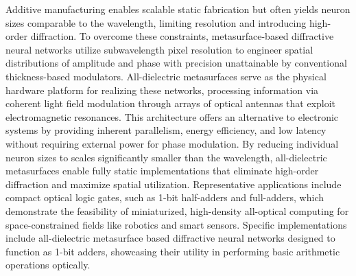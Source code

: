 \documentclass[11pt]{article}
\begin{document}
Additive manufacturing enables scalable static fabrication but often yields neuron sizes comparable to the wavelength, limiting resolution and introducing high-order diffraction. To overcome these constraints, metasurface-based diffractive neural networks utilize subwavelength pixel resolution to engineer spatial distributions of amplitude and phase with precision unattainable by conventional thickness-based modulators. All-dielectric metasurfaces serve as the physical hardware platform for realizing these networks, processing information via coherent light field modulation through arrays of optical antennas that exploit electromagnetic resonances. This architecture offers an alternative to electronic systems by providing inherent parallelism, energy efficiency, and low latency without requiring external power for phase modulation. By reducing individual neuron sizes to scales significantly smaller than the wavelength, all-dielectric metasurfaces enable fully static implementations that eliminate high-order diffraction and maximize spatial utilization. Representative applications include compact optical logic gates, such as 1-bit half-adders and full-adders, which demonstrate the feasibility of miniaturized, high-density all-optical computing for space-constrained fields like robotics and smart sensors. Specific implementations include all-dielectric metasurface based diffractive neural networks designed to function as 1-bit adders, showcasing their utility in performing basic arithmetic operations optically. \citep{doi_10_1515_nanoph_2023_0760_2c3ec088} \citep{doi_10_3390_nano14221812_4d7d91b1} \citep{doi_10_1515_nanoph_2023_0760_2c3ec088} \citep{doi_10_1117_12_2688132_926a2697}
\end{document}
